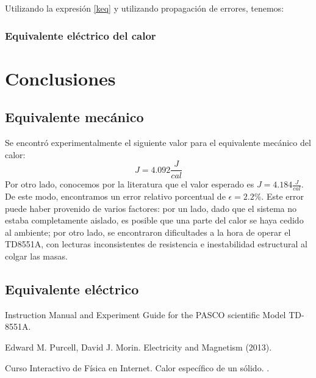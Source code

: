 \documentclass{article}
\begin{document}
Utilizando la expresión \ref{keq} y utilizando propagación de errores, tenemos:


\subsubsection{Equivalente eléctrico del calor}



\section{Conclusiones}
\subsection{Equivalente mecánico}
Se encontró experimentalmente el siguiente valor para el equivalente mecánico del calor:
\begin{equation*}
    J = 4.092 \frac{J}{cal}
\end{equation*}
Por otro lado, conocemos por la literatura\cite{pasco} que el valor esperado es $J = 4.184 \frac{J}{cal}$. De este modo, encontramos un error relativo porcentual de $\epsilon = 2.2\%$. Este error puede haber provenido de varios factores: por un lado, dado que el sistema no estaba completamente aislado, es posible que una parte del calor se haya cedido al ambiente; por otro lado, se encontraron dificultades a la hora de operar el TD8551A, con lecturas inconsistentes de resistencia e inestabilidad estructural al colgar las masas. 

\subsection{Equivalente eléctrico}



\begin{thebibliography}{X}

 Instruction Manual and Experiment Guide for the PASCO scientific Model TD-8551A. 

 Edward M. Purcell, David J. Morin. Electricity and Magnetism (2013).

 Curso Interactivo de Física en Internet. Calor específico de un sólido. . 

 \end{thebibliography}
\end{document}
